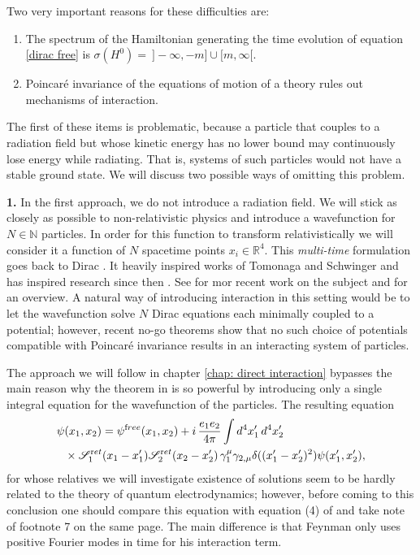 \documentclass[b5paper,draft,openbib,12pt]{memoir}
\newcommand{\ret}{{\textup ret}}
\newcommand{\free}{{\textup free}}
\begin{document}
Two very important reasons for these difficulties
are:
\begin{enumerate}
\item \label{item: instability}The spectrum of the Hamiltonian 
generating the 
time evolution of equation \eqref{dirac free} is 
\(\sigma(H^0)=~]-\infty,-m]\cup[m,\infty[\). 
\item Poincaré invariance of the equations of motion 
of a theory rules out mechanisms of interaction.
\end{enumerate}

The first of these items is problematic, because a particle 
that couples to a radiation field but whose kinetic energy 
has no lower bound may continuously lose energy while 
radiating. That is, systems of such particles would not 
have a stable ground state. We will discuss two possible 
ways of omitting this problem. 

\textbf{1.} In the first approach, we do not introduce a radiation 
field. We will stick as closely as possible to 
non-relativistic physics and introduce a wavefunction 
for \(N\in\mathbb{N}\) particles. In order for this function  
to transform relativistically we will consider it a
function of \(N\) spacetime points \(x_i\in\mathbb{R}^4\).
This \emph{multi-time} formulation 
goes back to Dirac \cite{dirac_32}. 
It heavily inspired works of Tomonaga \cite{tomonaga} and Schwinger 
\cite{schwinger} and has inspired research since then
\cite{marx_1974,schweber,drozvincent_1981,sazdjian_2bd,2bdem}. 
See 
\cite{qftmultitime,multitime_pair_creation,1d_model,
nt_model,2bd_current_cons,lpt_2017b,
ibc_model,phd_nickel} for mor recent work on the 
subject and \cite{dice_paper} for an overview. 
A natural way of introducing interaction in this setting 
would be to let the wavefunction 
solve \(N\) Dirac equations each minimally
coupled to a potential; however, recent no-go theorems 
\cite{nogo_potentials,deckert_nickel_2016} show that 
no such choice of potentials compatible with Poincaré 
invariance results in an interacting system of particles.

The approach we will follow in chapter \ref{chap: direct interaction}
bypasses the main reason why the theorem in \cite{deckert_nickel_2016} 
is so powerful by introducing only a single integral equation 
for the wavefunction of the particles. The resulting equation 
\begin{align}\label{eq:matt}
  \psi&(x_1,x_2) = \psi^\free(x_1,x_2)+i\, \frac{e_1e_2}{4\pi} \int d^4 x_1' \, d^4 x_2' \\\nonumber
  & \times \mathscr{S}^\ret_1(x_1-x_1') \mathscr{S}^\ret_2(x_2-x_2') \, \gamma_1^\mu \gamma_{2,\mu}\delta((x_1'-x_2')^2) \psi(x_1',x_2'),
\end{align}
for whose relatives we will investigate existence of solutions seem to 
be hardly related to the theory of 
quantum electrodynamics; however, before 
coming to this conclusion one should compare this 
equation with equation (4) of \cite{feynman1949space} and take 
note of footnote 7 on the same page. 
The main difference is that Feynman only uses positive Fourier
modes in time for his interaction term.
\end{document}
